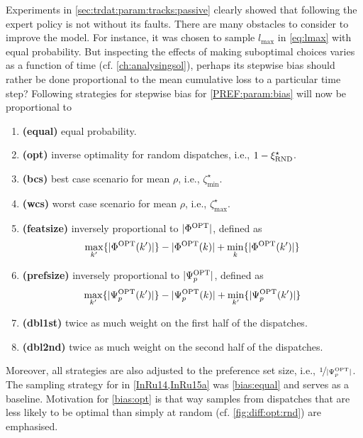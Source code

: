 Experiments in \cref{sec:trdat:param:tracks:passive} clearly showed that 
following the expert policy is not without its faults. 
There are many obstacles to consider to improve the model. 
For instance, it was chosen to sample $l_{\max}$ in \cref{eq:lmax} with equal 
probability. 
But inspecting the effects of making suboptimal choices varies as 
a function of time (cf. \cref{ch:analysingsol}), perhaps its stepwise bias 
should rather be done proportional to the mean cumulative loss to a particular 
time step?
Following strategies for stepwise bias for \ref{PREF:param:bias} will now 
be proportional to
\begin{enumerate}[after={{}}, leftmargin=*,
    label={\textbf{Bias.\arabic*}}, ref={{Bias.\arabic*}}]
    \item \textbf{(equal)} \label{bias:equal} equal probability. 
    \item \textbf{(opt)} \label{bias:opt} inverse optimality for random 
    dispatches, i.e., $1-\xi_{\text{RND}}^{\star}$.
    \item \textbf{(bcs)} \label{bias:bcs} best case scenario for mean $\rho$, 
    i.e., $\zeta^{\star}_{\min}$.
    \item \textbf{(wcs)} \label{bias:wcs} worst case scenario for mean $\rho$, 
    i.e., $\zeta^{\star}_{\max}$.
    \item \textbf{(featsize)} \label{bias:featsize} inversely proportional to 
    $\lvert\Phi^{\text{OPT}}\rvert$, defined as
    $$\max_{k'}\{\lvert\Phi^{\text{OPT}}(k')\rvert\}-\lvert\Phi^{\text{OPT}}(k)\rvert+\min_{k}\{\lvert\Phi^{\text{OPT}}(k')\rvert\}$$
    \item \textbf{(prefsize)} \label{bias:prefsize} inversely proportional to 
    $\lvert\Psi^{\text{OPT}}_p\rvert$, defined as  
    $$\max_{k'}\{\lvert\Psi^{\text{OPT}}_p(k')\rvert\}-\lvert\Psi^{\text{OPT}}_p(k)\rvert+\min_{k'}\{\lvert\Psi^{\text{OPT}}_p(k')\rvert\}$$
    \item \textbf{(dbl1st)} \label{bias:dbl1st} twice as much weight on the 
    first half of the dispatches.
    \item \textbf{(dbl2nd)} \label{bias:dbl2nd} twice as much weight on the 
    second half of the dispatches.
\end{enumerate}
Moreover, all strategies are also adjusted to the preference set size, i.e., 
$\nicefrac{1}{\lvert\Psi^{\text{OPT}}_p\rvert}$.
The sampling strategy for  in \cref{InRu14,InRu15a} was 
\ref{bias:equal} and serves as a baseline.  
Motivation for \ref{bias:opt} is that way samples from dispatches that are less 
likely to be optimal than simply at random (cf. \cref{fig:diff:opt:rnd}) are 
emphasised. 

